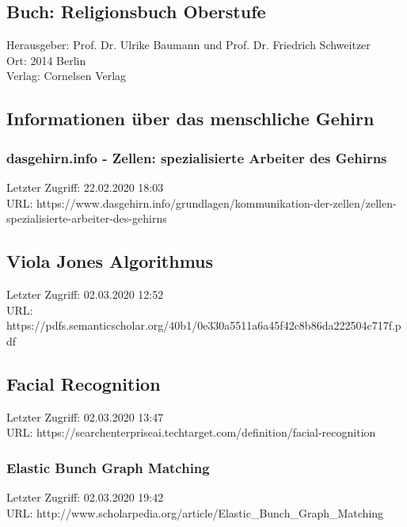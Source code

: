 	\subsection{Buch: Religionsbuch Oberstufe}
	\label{book:religionsbuch_oberstufe}
		Herausgeber: Prof. Dr. Ulrike Baumann und Prof. Dr. Friedrich Schweitzer\\
		Ort: 2014 Berlin\\
		Verlag: Cornelsen Verlag\\

\subsection{Informationen über das menschliche Gehirn}
\label{subsec:Informationen_ueber_das_menschliche_Gehirn}
	\subsubsection{dasgehirn.info - Zellen: spezialisierte Arbeiter des Gehirns}
	\label{subsubsec:dasgehirn:Zellen-Arbeiter_Des_Gehrins}
	Letzter Zugriff: 22.02.2020 18:03\\
	URL: https://www.dasgehirn.info/grundlagen/kommunikation-der-zellen/zellen-spezialisierte-arbeiter-des-gehirns

\subsection{Viola Jones Algorithmus}
\label{algoryhtm:viola_jones}
	Letzter Zugriff: 02.03.2020 12:52\\
	URL: https://pdfs.semanticscholar.org/40b1/0e330a5511a6a45f42c8b86da222504c717f.pdf

\subsection{Facial Recognition}
\label{source:searchenterpriseai:facial_recognition}
	Letzter Zugriff: 02.03.2020 13:47\\
	URL: https://searchenterpriseai.techtarget.com/definition/facial-recognition

	\subsubsection{Elastic Bunch Graph Matching}
	\label{scholarpedia:ebgm}
	Letzter Zugriff: 02.03.2020 19:42\\
	URL: http://www.scholarpedia.org/article/Elastic\_Bunch\_Graph_Matching

